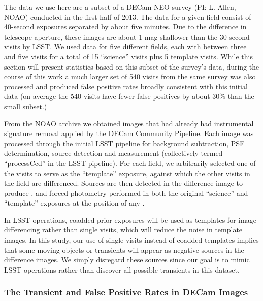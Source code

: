 The data we use here are a subset of a DECam NEO survey (PI: L. Allen, NOAO) conducted
in the first half of 2013. The data for a given field consist of 40-second exposures separated
by about five minutes. Due to the difference in telescope aperture, these images
are about 1 mag shallower than the 30 second visits by LSST. We used data for
five different fields, each with between three and five visits for a total of 15
``science'' visits plus 5 template visits. While this section will present
statistics based on this subset of the survey's data, during the course of this
work a much larger set of 540 visits from the same survey was also processed and
produced false positive rates broadly consistent with this initial data (on
average the 540 visits have fewer false positives by about 30\% than the small
subset.)

From the NOAO archive we obtained images that had already had instrumental
signature removal applied by the DECam Community Pipeline. Each image was
processed through the initial LSST pipeline for background subtraction, PSF
determination, source detection and measurement (collectively
termed ``processCcd'' in the LSST pipeline). For each field, we arbitrarily
selected one of the visits to serve as the ``template'' exposure, against which
the other visits in the field are differenced. Sources are then detected in the
difference image to produce \DIASources, and forced photometry performed in both
the original ``science'' and ``template'' exposures at the position of any
\DIASource.

In LSST operations, coadded prior exposures will be used
as templates for image differencing rather than single visits, which will reduce
the noise in template images. In this study, our use of single visits instead of
coadded templates implies that some moving objects or transients will appear as
negative sources in the difference images. We simply disregard these sources
since our goal is to mimic LSST operations rather than discover all possible
transients in this dataset.


\subsubsection{The Transient and False Positive Rates in DECam Images}

